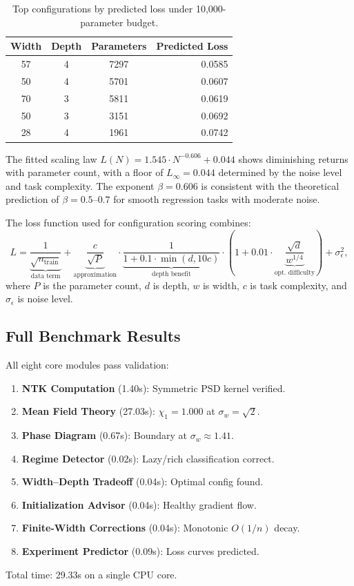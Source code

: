 \documentclass[10pt]{article}
\theoremstyle{definition}
\begin{document}
\begin{table}[htbp]
\centering
\caption{Top configurations by predicted loss under 10{,}000-parameter budget.}
\label{tab:wd-top}
\begin{tabular}{cccr}
\toprule
Width & Depth & Parameters & Predicted Loss \\
\midrule
57  & 4  & 7297  & 0.0585 \\
50  & 4  & 5701  & 0.0607 \\
70  & 3  & 5811  & 0.0619 \\
50  & 3  & 3151  & 0.0692 \\
28  & 4  & 1961  & 0.0742 \\
\bottomrule
\end{tabular}
\end{table}

The fitted scaling law $L(N) = 1.545 \cdot N^{-0.606} + 0.044$ shows diminishing returns with parameter count, with a floor of $L_\infty = 0.044$ determined by the noise level and task complexity.
The exponent $\beta = 0.606$ is consistent with the theoretical prediction of $\beta = 0.5$--$0.7$ for smooth regression tasks with moderate noise.

The loss function used for configuration scoring combines:
\begin{equation}
  L = \underbrace{\frac{1}{\sqrt{n_{\text{train}}}}}_{\text{data term}} + \underbrace{\frac{c}{\sqrt{P}}}_{\text{approximation}} \cdot \underbrace{\frac{1}{1 + 0.1 \cdot \min(d, 10c)}}_{\text{depth benefit}} \cdot (1 + 0.01 \cdot \underbrace{\frac{\sqrt{d}}{w^{1/4}}}_{\text{opt.\ difficulty}}) + \sigma_\epsilon^2,
\end{equation}
where $P$ is the parameter count, $d$ is depth, $w$ is width, $c$ is task complexity, and $\sigma_\epsilon$ is noise level.

\subsection{Full Benchmark Results}

All eight core modules pass validation:
\begin{enumerate}[nosep]
  \item \textbf{NTK Computation} (1.40s): Symmetric PSD kernel verified.
  \item \textbf{Mean Field Theory} (27.03s): $\chi_1 = 1.000$ at $\sigma_w = \sqrt{2}$.
  \item \textbf{Phase Diagram} (0.67s): Boundary at $\sigma_w \approx 1.41$.
  \item \textbf{Regime Detector} (0.02s): Lazy/rich classification correct.
  \item \textbf{Width--Depth Tradeoff} (0.04s): Optimal config found.
  \item \textbf{Initialization Advisor} (0.04s): Healthy gradient flow.
  \item \textbf{Finite-Width Corrections} (0.04s): Monotonic $O(1/n)$ decay.
  \item \textbf{Experiment Predictor} (0.09s): Loss curves predicted.
\end{enumerate}
Total time: 29.33s on a single CPU core.
\end{document}
